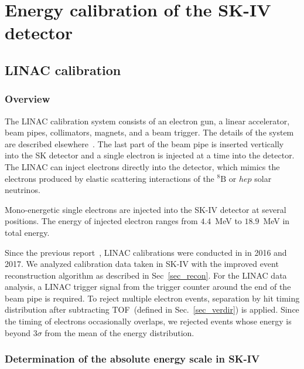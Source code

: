 \documentclass[aps,prd,reprint,superscriptaddress,floatfix,altaffilletter,nofootinbib]{revtex4-2}
\begin{document}

\section{Energy calibration of the SK-IV detector} \label{sec_calib}


\subsection{LINAC calibration} \label{sec:linac}

\subsubsection{Overview}

The LINAC calibration system consists of an electron gun, a linear accelerator, beam pipes, collimators, magnets, and a beam trigger. 
The details of the system are described elsewhere~\cite{Nakahata:1998pz}. 
The last part of the beam pipe is inserted vertically into the SK detector and a single electron is injected at a time into the detector. 
The LINAC can inject electrons directly into the detector, which mimics the electrons produced by elastic scattering interactions of the $\mathrm{^{8}B}$ or $hep$ solar neutrinos. 

Mono-energetic single electrons are injected into the SK-IV detector at several positions. 
The energy of injected electron ranges from $4.4$~MeV to $18.9$~MeV in total energy. 

Since the previous report~\cite{Abe:2016nxk}, LINAC calibrations were conducted in in 2016 and 2017. 
We analyzed calibration data taken in SK-IV with the improved event reconstruction algorithm as described in Sec~\ref{sec_recon}. 
For the LINAC data analysis, a LINAC trigger signal from the trigger counter around the end of the beam pipe is required. 
To reject multiple electron events, separation by hit timing distribution after subtracting TOF~(defined in Sec.~\ref{sec_verdir}) is applied.
Since the timing of electrons occasionally overlaps, we rejected events whose energy is beyond $3\sigma$ from the mean of the energy distribution.

\subsubsection{Determination of the absolute energy scale in SK-IV}
\end{document}
